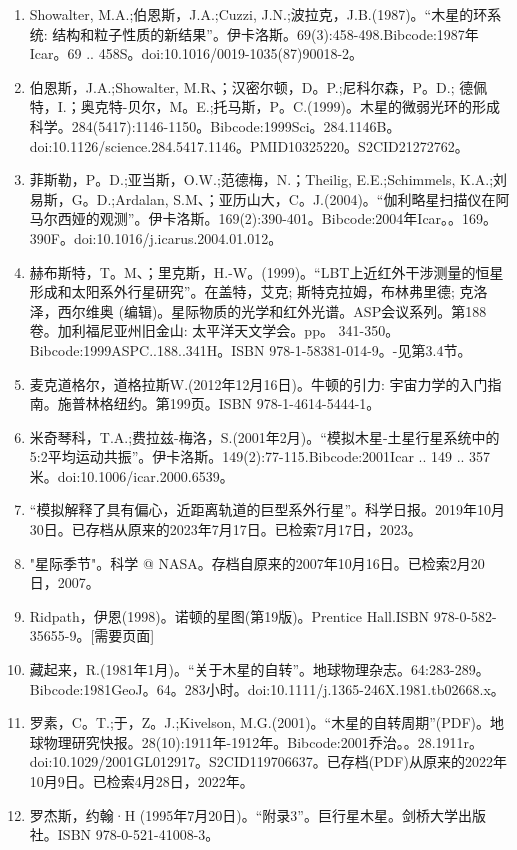 \begin{enumerate}
\item Showalter, M.A.;伯恩斯，J.A.;Cuzzi, J.N.;波拉克，J.B.(1987)。“木星的环系统: 结构和粒子性质的新结果”。伊卡洛斯。69(3):458-498.Bibcode:1987年Icar。69 .. 458S。doi:10.1016/0019-1035(87)90018-2。
\item 伯恩斯，J.A.;Showalter, M.R、；汉密尔顿，D。P.;尼科尔森，P。D.; 德佩特，I.；奥克特-贝尔，M。E.;托马斯，P。C.(1999)。木星的微弱光环的形成科学。284(5417):1146-1150。Bibcode:1999Sci。284.1146B。doi:10.1126/science.284.5417.1146。PMID10325220。S2CID21272762。  
\item 菲斯勒，P。D.;亚当斯，O.W.;范德梅，N.；Theilig, E.E.;Schimmels, K.A.;刘易斯，G。D.;Ardalan, S.M、；亚历山大，C。J.(2004)。“伽利略星扫描仪在阿马尔西娅的观测”。伊卡洛斯。169(2):390-401。Bibcode:2004年Icar。。169。390F。doi:10.1016/j.icarus.2004.01.012。
\item 赫布斯特，T。M、；里克斯，H.-W。(1999)。“LBT上近红外干涉测量的恒星形成和太阳系外行星研究”。在盖特，艾克; 斯特克拉姆，布林弗里德; 克洛泽，西尔维奥 (编辑)。星际物质的光学和红外光谱。ASP会议系列。第188卷。加利福尼亚州旧金山: 太平洋天文学会。pp。 341-350。Bibcode:1999ASPC..188..341H。ISBN 978-1-58381-014-9。-见第3.4节。
\item 麦克道格尔，道格拉斯W.(2012年12月16日)。牛顿的引力: 宇宙力学的入门指南。施普林格纽约。第199页。ISBN 978-1-4614-5444-1。
\item 米奇琴科，T.A.;费拉兹-梅洛，S.(2001年2月)。“模拟木星-土星行星系统中的5:2平均运动共振”。伊卡洛斯。149(2):77-115.Bibcode:2001Icar .. 149 .. 357米。doi:10.1006/icar.2000.6539。
\item “模拟解释了具有偏心，近距离轨道的巨型系外行星”。科学日报。2019年10月30日。已存档从原来的2023年7月17日。已检索7月17日，2023。
\item "星际季节"。科学 @ NASA。存档自原来的2007年10月16日。已检索2月20日，2007。
\item Ridpath，伊恩(1998)。诺顿的星图(第19版)。Prentice Hall.ISBN 978-0-582-35655-9。[需要页面]
\item 藏起来，R.(1981年1月)。“关于木星的自转”。地球物理杂志。64:283-289。Bibcode:1981GeoJ。64。283小时。doi:10.1111/j.1365-246X.1981.tb02668.x。
\item 罗素，C。T.;于，Z。J.;Kivelson, M.G.(2001)。“木星的自转周期”(PDF)。地球物理研究快报。28(10):1911年-1912年。Bibcode:2001乔治。。28.1911r。doi:10.1029/2001GL012917。S2CID119706637。已存档(PDF)从原来的2022年10月9日。已检索4月28日，2022年。  
\item 罗杰斯，约翰·H (1995年7月20日)。“附录3”。巨行星木星。剑桥大学出版社。ISBN 978-0-521-41008-3。

\end{enumerate}
